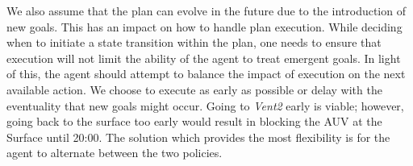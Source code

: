%


We also assume that the plan can evolve in the future due to the
introduction of new goals. This has an impact on how to handle plan
execution. While deciding when to initiate a state transition within
the plan, one needs to ensure that execution will not limit the
ability of the agent to treat emergent goals. In light of this, the
agent should attempt to balance the impact of execution on the next
available action. We choose to execute as early as possible or delay
with the eventuality that new goals might occur. Going to \emph{Vent2}
early is viable; however, going back to the surface too early would
result in blocking the AUV at the Surface until 20:00. The solution
which provides the most flexibility is for the agent to alternate
between the two policies.

